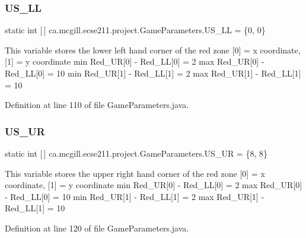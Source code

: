 \subsubsection{\texorpdfstring{U\+S\+\_\+\+LL}{US\_LL}}
{\footnotesize\ttfamily  static  int \mbox{[}$\,$\mbox{]} ca.\+mcgill.\+ecse211.\+project.\+Game\+Parameters.\+U\+S\+\_\+\+LL = \{0, 0\}\hspace{0.3cm}{\ttfamily [static]}}

This variable stores the lower left hand corner of the red zone \mbox{[}0\mbox{]} = x coordinate, \mbox{[}1\mbox{]} = y coordinate min Red\+\_\+\+UR\mbox{[}0\mbox{]} -\/ Red\+\_\+\+LL\mbox{[}0\mbox{]} = 2 max Red\+\_\+\+UR\mbox{[}0\mbox{]} -\/ Red\+\_\+\+LL\mbox{[}0\mbox{]} = 10 min Red\+\_\+\+UR\mbox{[}1\mbox{]} -\/ Red\+\_\+\+LL\mbox{[}1\mbox{]} = 2 max Red\+\_\+\+UR\mbox{[}1\mbox{]} -\/ Red\+\_\+\+LL\mbox{[}1\mbox{]} = 10 

Definition at line 110 of file Game\+Parameters.\+java.

\mbox{\label{enumca_1_1mcgill_1_1ecse211_1_1project_1_1_game_parameters_ab53ad7cced40d028fd0bbc3472cd2f8d}} 
\subsubsection{\texorpdfstring{U\+S\+\_\+\+UR}{US\_UR}}
{\footnotesize\ttfamily  static  int \mbox{[}$\,$\mbox{]} ca.\+mcgill.\+ecse211.\+project.\+Game\+Parameters.\+U\+S\+\_\+\+UR = \{8, 8\}\hspace{0.3cm}{\ttfamily [static]}}

This variable stores the upper right hand corner of the red zone \mbox{[}0\mbox{]} = x coordinate, \mbox{[}1\mbox{]} = y coordinate min Red\+\_\+\+UR\mbox{[}0\mbox{]} -\/ Red\+\_\+\+LL\mbox{[}0\mbox{]} = 2 max Red\+\_\+\+UR\mbox{[}0\mbox{]} -\/ Red\+\_\+\+LL\mbox{[}0\mbox{]} = 10 min Red\+\_\+\+UR\mbox{[}1\mbox{]} -\/ Red\+\_\+\+LL\mbox{[}1\mbox{]} = 2 max Red\+\_\+\+UR\mbox{[}1\mbox{]} -\/ Red\+\_\+\+LL\mbox{[}1\mbox{]} = 10 

Definition at line 120 of file Game\+Parameters.\+java.

